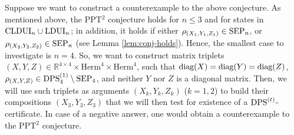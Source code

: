 \documentclass[11pt]{article}
\newcommand{\R}{\ensuremath{\mathbb{R}}}   %
\newcommand{\Herm}{\mathrm{Herm}}
\newcommand{\SEP}{\text{\rm SEP}}
\newcommand{\CLDUI}{\text{\rm CLDUI}}
\newcommand{\LDUI}{\text{\rm LDUI}}
\newcommand{\DPS}{\text{\rm DPS}}
\newcommand{\diag}{\text{\rm diag}}
\theoremstyle{plain}
\begin{document}
Suppose we want to construct a counterexample to the above conjecture. 
As mentioned above, the PPT$^2$ conjecture holds for $n\leq3$ and for states in $\CLDUI_n\cup\LDUI_n$; in addition, it holds 
 if either $\rho_{(X_1,Y_1,Z_1)}\in\SEP_n$, or $\rho_{(X_2,Y_2,Z_2)}\in\SEP_n$ (see  Lemma \ref{lem:conj-holds}).
Hence, the smallest case to investigate is $n=4$. So, we want to construct matrix triplets $(X,Y,Z)\in\R^{4\times 4}\times\Herm^4\times\Herm^4$, such that $\diag(X)=\diag(Y)=\diag(Z)$, $\rho_{(X,Y,Z)}\in\DPS^{(1)}_4\setminus\SEP_4$, and neither $Y$ nor $Z$ is a diagonal matrix. 
Then, we will use such triplets as arguments $(X_k,Y_k,Z_k)$ ($k=1,2$) to build their compositions $(X_3,Y_3,Z_3)$ that we will then test for existence of a $\DPS^{(t)}$-certificate. In case of a negative answer, one would obtain a counterexample to the PPT$^2$ conjecture.
\end{document}
